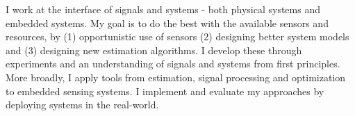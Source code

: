 \documentclass[10pt]{article}
\begin{document}
I work at the interface of signals and systems - both physical systems and embedded systems. 
My goal is to do the best with the available sensors and resources, by (1) opportunistic use of sensors (2) designing better system models and (3) designing new estimation algorithms. I develop these through experiments and an understanding of signals and systems from first principles. %
More broadly, I apply tools from estimation, signal processing and optimization to embedded sensing systems. I implement and evaluate my approaches by deploying systems in the real-world. \\
\end{document}
